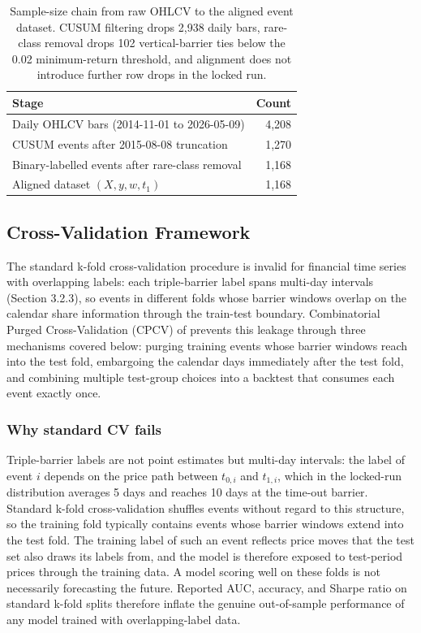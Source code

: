 \documentclass[12pt,a4paper,oneside]{article}
\begin{document}
\begin{table}[H]
\centering
\begin{tabular}{lr}
\toprule
Stage & Count \\
\midrule
Daily OHLCV bars (2014-11-01 to 2026-05-09) & 4,208 \\
CUSUM events after 2015-08-08 truncation & 1,270 \\
Binary-labelled events after rare-class removal & 1,168 \\
Aligned dataset $(X, y, w, t_1)$ & 1,168 \\
\bottomrule
\end{tabular}
\caption{Sample-size chain from raw OHLCV to the aligned event dataset. CUSUM filtering drops 2,938 daily bars, rare-class removal drops 102 vertical-barrier ties below the 0.02 minimum-return threshold, and alignment does not introduce further row drops in the locked run.}
\label{tab:alignment_summary}
\end{table}


\subsection{Cross-Validation Framework}\label{subsec:cpcv}

The standard k-fold cross-validation procedure is invalid for financial time series with overlapping labels: each triple-barrier label spans multi-day intervals (Section 3.2.3), so events in different folds whose barrier windows overlap on the calendar share information through the train-test boundary. Combinatorial Purged Cross-Validation (CPCV) of \citet[Chapter 12]{lopez_de_prado_2018} prevents this leakage through three mechanisms covered below: purging training events whose barrier windows reach into the test fold, embargoing the calendar days immediately after the test fold, and combining multiple test-group choices into a backtest that consumes each event exactly once.


\subsubsection{Why standard CV fails}\label{subsubsec:cv_fail}

Triple-barrier labels are not point estimates but multi-day intervals: the label of event $i$ depends on the price path between $t_{0,i}$ and $t_{1,i}$, which in the locked-run distribution averages 5 days and reaches 10 days at the time-out barrier. Standard k-fold cross-validation shuffles events without regard to this structure, so the training fold typically contains events whose barrier windows extend into the test fold. The training label of such an event reflects price moves that the test set also draws its labels from, and the model is therefore exposed to test-period prices through the training data. A model scoring well on these folds is not necessarily forecasting the future. Reported AUC, accuracy, and Sharpe ratio on standard k-fold splits therefore inflate the genuine out-of-sample performance of any model trained with overlapping-label data.
\end{document}
